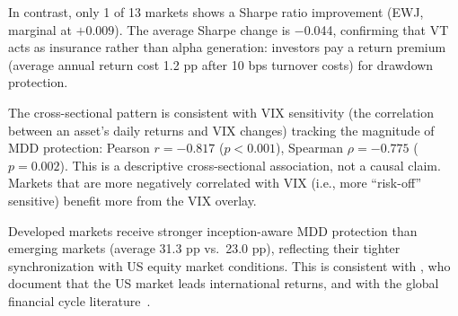 In contrast, only 1 of 13 markets shows a Sharpe ratio improvement (EWJ, marginal at $+0.009$). The average Sharpe change is $-$0.044, confirming that VT acts as insurance rather than alpha generation: investors pay a return premium (average annual return cost 1.2 pp after 10 bps turnover costs) for drawdown protection.

The cross-sectional pattern is consistent with VIX sensitivity (the correlation between an asset's daily returns and VIX changes) tracking the magnitude of MDD protection: Pearson $r = -0.817$ ($p < 0.001$), Spearman $\rho = -0.775$ ($p = 0.002$). This is a descriptive cross-sectional association, not a causal claim. Markets that are more negatively correlated with VIX (i.e., more ``risk-off'' sensitive) benefit more from the VIX overlay.

Developed markets receive stronger inception-aware MDD protection than emerging markets (average 31.3 pp vs.\ 23.0 pp), reflecting their tighter synchronization with US equity market conditions. This is consistent with \citet{rapach2013}, who document that the US market leads international returns, and with the global financial cycle literature~\citep{miranda2020}.


